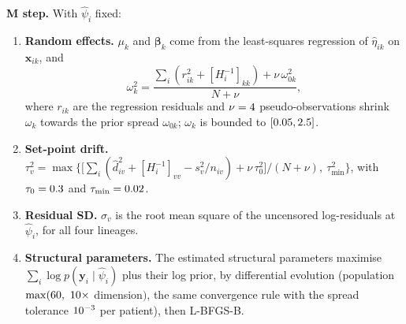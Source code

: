 \documentclass[11pt]{article}
\begin{document}
\textbf{M step.} With $\hat\psi_i$ fixed:
\begin{enumerate}
\item \textbf{Random effects.} $\mu_k$ and $\boldsymbol\beta_k$ come from the least-squares regression of $\hat\eta_{ik}$ on $\mathbf x_{ik}$, and
\[
\omega_k^2=\frac{\sum_i(r_{ik}^2+[H_i^{-1}]_{kk})+\nu\,\omega_{0k}^2}{N+\nu},
\]
where $r_{ik}$ are the regression residuals and $\nu=4$ pseudo-observations shrink $\omega_k$ towards the prior spread $\omega_{0k}$; $\omega_k$ is bounded to $[0.05,2.5]$.
\item \textbf{Set-point drift.} $\tau_v^2=\max\bigl\{\bigl[\sum_i(\hat d_{iv}^2+[H_i^{-1}]_{vv}-s_v^2/n_{iv})+\nu\,\tau_0^2\bigr]/(N+\nu),\ \tau_{\min}^2\bigr\}$, with $\tau_0=0.3$ and $\tau_{\min}=0.02$.
\item \textbf{Residual SD.} $\sigma_v$ is the root mean square of the uncensored log-residuals at $\hat\psi_i$, for all four lineages.
\item \textbf{Structural parameters.} The estimated structural parameters maximise $\sum_i\log p(\mathbf y_i\mid\hat\psi_i)$ plus their log prior, by differential evolution (population $\max(\valDeStructNpMin,\ \valDeStructNpDim\times$ dimension$)$, the same convergence rule with the spread tolerance $10^{-3}$ per patient), then L-BFGS-B.
\end{enumerate}
\end{document}
